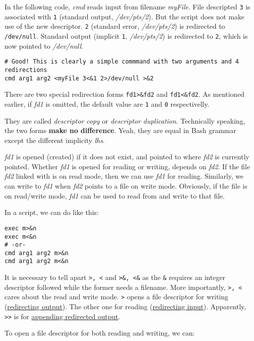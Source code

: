 In the following code, \textit{cmd} reads input from filename
\textit{myFile}. File descripted \verb|3| is associated with
\verb|1| (standard output, \textit{/dev/pts/2}). But the script
does not make use of the new descriptor. \verb|2| (standard error,
\textit{/dev/pts/2}) is redirected to
\lstinline|/dev/null|. Standard output (implicit \verb|1|,
\textit{/dev/pts/2}) is redirected to \verb|2|, which is now
pointed to \textit{/dev/null}.

\begin{lstlisting}
# Good! This is clearly a simple commmand with two arguments and 4 redirections
cmd arg1 arg2 <myFile 3<&1 2>/dev/null >&2
\end{lstlisting}

There are two special redirection forms \lstinline|fd1>&fd2| and
\lstinline|fd1<&fd2|. As mentioned earlier, if \textit{fd1} is
omitted, the default value are \verb|1| and \verb|0|
respectivelly.

They are called \textit{descriptor copy} or \textit{descriptor
  duplication}. Technically speaking, the two forms \textbf{make no
  difference}. Yeah, they are equal in Bash grammar except the
different implicity \textit{lhs}.

\textit{fd1} is opened (created) if it does not exist, and pointed
to where \textit{fd2} is currently pointed. Whether \textit{fd1}
is opened for reading or writing, depends on \textit{fd2}. If the
file \textit{fd2} linked with is on read mode, then we can use
\textit{fd1} for reading. Similarly, we can write to \textit{fd1}
when \textit{fd2} points to a file on write mode. Obviously, if
the file is on read/write mode, \textit{fd1} can be used to read
from and write to that file.

In a script, we can do like this:

\begin{lstlisting}
exec m>&n
exec m<&n
# -or-
cmd arg1 arg2 m>&n
cmd arg1 arg2 m<&n
\end{lstlisting}

It is necessary to tell apart \verb|>, <| and \verb|>&, <&| as the
\verb|&| requires an integer descriptor followed while the former
needs a filename. More importantly, \verb|>, <| cares about the
read and write mode. \verb|>| opens a file descriptor for writing
(\uline{redirecting output}). The other one for reading
(\uline{redirecting input}). Apparently, \verb|>>| is for
\uline{appending redirected output}.

To open a file descriptor for both reading and
writing, we can:

